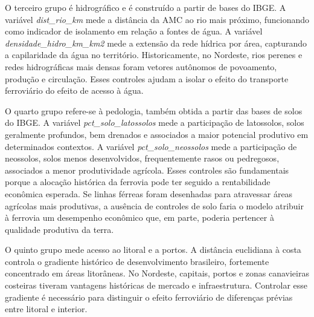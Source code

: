 \documentclass[12pt,a4paper]{article}
\begin{document}
O terceiro grupo é hidrográfico e é construído a partir de bases do IBGE. A variável \textit{dist\_rio\_km} mede a distância da AMC ao rio mais próximo, funcionando como indicador de isolamento em relação a fontes de água. A variável \textit{densidade\_hidro\_km\_km2} mede a extensão da rede hídrica por área, capturando a capilaridade da água no território. Historicamente, no Nordeste, rios perenes e redes hidrográficas mais densas foram vetores autônomos de povoamento, produção e circulação. Esses controles ajudam a isolar o efeito do transporte ferroviário do efeito de acesso à água.

O quarto grupo refere-se à pedologia, também obtida a partir das bases de solos do IBGE. A variável \textit{pct\_solo\_latossolos} mede a participação de latossolos, solos geralmente profundos, bem drenados e associados a maior potencial produtivo em determinados contextos. A variável \textit{pct\_solo\_neossolos} mede a participação de neossolos, solos menos desenvolvidos, frequentemente rasos ou pedregosos, associados a menor produtividade agrícola. Esses controles são fundamentais porque a alocação histórica da ferrovia pode ter seguido a rentabilidade econômica esperada. Se linhas férreas foram desenhadas para atravessar áreas agrícolas mais produtivas, a ausência de controles de solo faria o modelo atribuir à ferrovia um desempenho econômico que, em parte, poderia pertencer à qualidade produtiva da terra.

O quinto grupo mede acesso ao litoral e a portos. A distância euclidiana à costa controla o gradiente histórico de desenvolvimento brasileiro, fortemente concentrado em áreas litorâneas. No Nordeste, capitais, portos e zonas canavieiras costeiras tiveram vantagens históricas de mercado e infraestrutura. Controlar esse gradiente é necessário para distinguir o efeito ferroviário de diferenças prévias entre litoral e interior.
\end{document}
